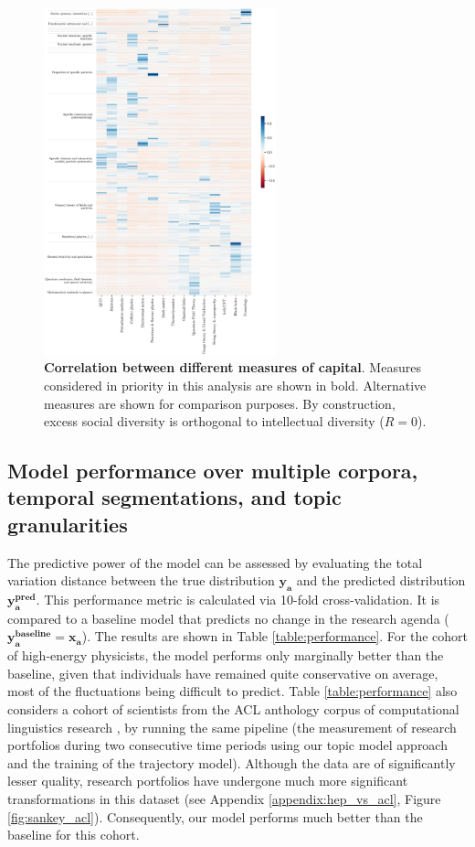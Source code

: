 \documentclass{article}
\begin{document}
\begin{figure}[h]
    \centering
    \includegraphics[width=0.6\textwidth]{Fig15}
    \caption{\textbf{Correlation between different measures of capital}. Measures considered in priority in this analysis are shown in bold. Alternative measures are shown for comparison purposes. By construction, excess social diversity is orthogonal to intellectual diversity ($R=0$). }
    \label{fig:capital_measures}
\end{figure}


\subsection{\label{appendix:model-performance}Model performance over multiple corpora, temporal segmentations, and topic granularities}

The predictive power of the model can be assessed by evaluating the total variation distance between the true distribution $\bm{y_a}$ and the predicted distribution $\bm{y_a^{\text{pred}}}$. This performance metric is calculated via 10-fold cross-validation. It is compared  to a baseline model that predicts no change in the research agenda ($\bm{y_a^{\text{baseline}}}=\bm{x_a}$). The results are shown in Table \ref{table:performance}. For the cohort of high-energy physicists, the model performs only marginally better than the baseline, given that individuals have remained quite conservative on average, most of the fluctuations being difficult to predict. Table \ref{table:performance} also considers a cohort of scientists from the ACL anthology corpus  of computational linguistics research \citep{acl_anthology_corpus}, by running the same pipeline (the measurement of research portfolios during two consecutive time periods using our topic model approach and the training of the trajectory model). Although the data are of significantly lesser quality, research portfolios have undergone much more significant transformations in this dataset (see Appendix \ref{appendix:hep_vs_acl}, Figure \ref{fig:sankey_acl}). Consequently, our model performs much better than the baseline for this cohort.
\end{document}
